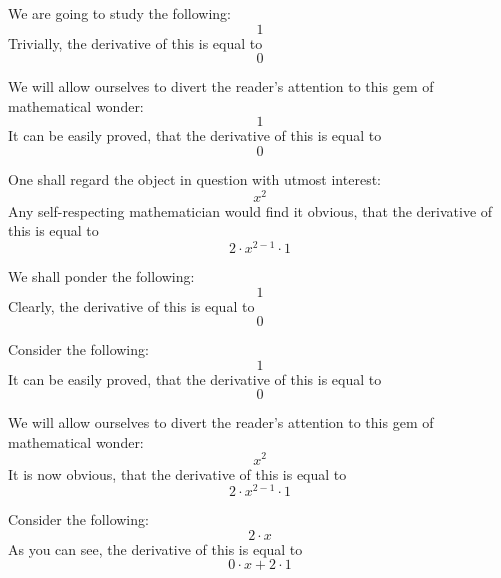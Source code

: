 \documentclass{article}
\begin{document}
We are going to study the following:
\begin{equation}
1 
\end{equation}
Trivially, the derivative of this is equal to
\begin{equation}
0 
\end{equation}

We will allow ourselves to divert the reader's attention to this gem of mathematical wonder:
\begin{equation}
1 
\end{equation}
It can be easily proved, that the derivative of this is equal to
\begin{equation}
0 
\end{equation}

One shall regard the object in question with utmost interest:
\begin{equation}
x ^{2 } 
\end{equation}
Any self-respecting mathematician would find it obvious, that the derivative of this is equal to
\begin{equation}
2 \cdot x ^{2 - 1 } \cdot 1 
\end{equation}

We shall ponder the following:
\begin{equation}
1 
\end{equation}
Clearly, the derivative of this is equal to
\begin{equation}
0 
\end{equation}

Consider the following:
\begin{equation}
1 
\end{equation}
It can be easily proved, that the derivative of this is equal to
\begin{equation}
0 
\end{equation}

We will allow ourselves to divert the reader's attention to this gem of mathematical wonder:
\begin{equation}
x ^{2 } 
\end{equation}
It is now obvious, that the derivative of this is equal to
\begin{equation}
2 \cdot x ^{2 - 1 } \cdot 1 
\end{equation}

Consider the following:
\begin{equation}
2 \cdot x 
\end{equation}
As you can see, the derivative of this is equal to
\begin{equation}
0 \cdot x + 2 \cdot 1 
\end{equation}
\end{document}
